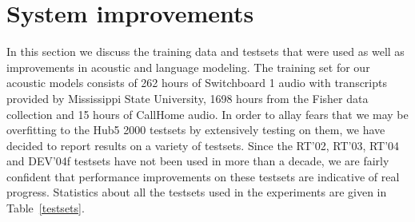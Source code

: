 \documentclass[a4paper]{article}
\begin{document}
\begin{table}[htpb!]
\centering
{}
\caption{\label{del-ins}Most frequent deletion and insertion errors for humans and ASR system on SWB and CH.}
\end{table}
\section{System improvements}
\label{system}
In this section we discuss the training data and testsets that were
used as well as improvements in acoustic and language modeling. The
training set for our acoustic models consists of 262 hours of
Switchboard 1 audio with transcripts provided by Mississippi State
University, 1698 hours from the Fisher data collection and 15 hours of
CallHome audio. In order to allay fears that we may be overfitting to
the Hub5 2000 testsets by extensively testing on them, we have decided
to report results on a variety of testsets. Since the RT'02, RT'03,
RT'04 and DEV'04f testsets have not been used in more than a decade,
we are fairly confident that performance improvements on these
testsets are indicative of real progress.  Statistics about all the
testsets used in the experiments are given in Table~\ref{testsets}.
\end{document}
